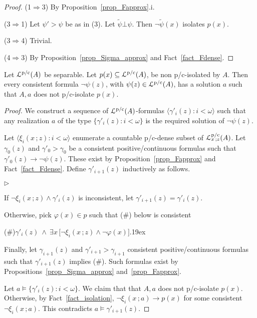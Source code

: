 \documentclass[10pt,oneside]{amsproc}
\newcommand{\mylabel}[1]{{#1}\hfill}
\renewenvironment{itemize}
  {\begin{list}{$\triangleright$}{%
  \setlength{\parskip}{0mm}
  \setlength{\topsep}{.4\baselineskip}
  \setlength{\rightmargin}{0mm}
  \setlength{\listparindent}{0mm}
  \setlength{\itemindent}{0mm}
  \setlength{\labelwidth}{3ex}
  \setlength{\itemsep}{.2\baselineskip}
  \setlength{\parsep}{.2\baselineskip}
  \setlength{\partopsep}{0mm}
  \setlength{\labelsep}{1ex}
  \setlength{\leftmargin}{\labelwidth+\labelsep}
  \let\makelabel\mylabel}}{%
\end{list}}
\begin{document}
{\begin{proof}
  (1$\Rightarrow$3) By Proposition~\ref{prop_Fapprox}.i.

  (3$\Rightarrow$1) Let $\psi'>\psi$ be as in (3). Let $\tilde{\psi}\bot\psi$. Then $\neg\tilde{\psi}(x)$ isolates $p(x)$.
  
  (3$\Rightarrow$4) Trivial.
  
  (4$\Rightarrow$3) By Proposition~\ref{prop_Sigma_approx} and Fact~\ref{fact_Fdense}. 
\end{proof}


\begin{lemma}\label{lem_kuratowskiUlam}
  Let ${\EuScript L}^{\rm p/c}(A)$ be separable.
  Let $p(x)\subseteq{\EuScript L}^{\rm p/c}(A)$, be non p/c-isolated by $A$.
  Then every consistent formula $\neg\psi(z)$, with $\psi(z)\in{\EuScript L}^{\rm p/c}(A)$, has a solution $a$ such that $A,a$ does not p/c-isolate $p(x)$.
\end{lemma}

\begin{proof}
  We construct a sequence of ${\EuScript L}^{\rm p/c}(A)$-formulas $\langle\gamma'_i(z):i<\omega\rangle$ such that any realization $a$ of the type $\big\{\gamma'_i(z):i<\omega\big\}$ is the required solution of $\neg\psi(z)$.
  
  Let $\langle\xi_i(x\,;z):i<\omega\rangle$ enumerate a countable p/c-dense subset of ${\EuScript L}^{\rm p/c}_{x\,;z}(A)$.
  Let $\gamma_0(z)$ and $\gamma'_0>\gamma_0$ be a consistent positive/continuous formulas such that $\gamma'_0(z)\rightarrow\neg\psi(z)$.
  These exist by Proposition~\ref{prop_Fapprox} and Fact~\ref{fact_Fdense}.
  Define $\gamma'_{i+1}(z)$ inductively as follows.
  
  \begin{itemize}
  \item[1.] If $\neg\xi_i(x\,;z)\wedge\gamma'_i(z)$ is inconsistent, let  $\gamma'_{i+1}(z)=\gamma'_i(z)$.
  \item[2.] Otherwise, pick $\varphi(x)\in p$ such that (\#) below is consistent
  
  (\#)\hfil$\gamma'_i(z)\ \wedge\ \exists x\,\big[\neg\xi_i(x\,;z)\wedge\neg\varphi(x)\big].$\kern19ex
  
  Finally, let $\gamma_{i+1}(z)$ and $\gamma'_{i+1}>\gamma_{i+1}$ consistent positive/continuous formulas such that $\gamma'_{i+1}(z)$ implies (\#).
  Such formulas exist by Propositions~\ref{prop_Sigma_approx} and~\ref{prop_Fapprox}.
  \end{itemize}
  
  Let $a\models\{\gamma'_i(z):i<\omega\}$.
  We claim that that $A,a$ does not p/c-isolate $p(x)$.
  Otherwise, by Fact~\ref{fact_isolation}, $\neg\xi_i(x\,;a)\rightarrow p(x)$ for some consistent $\neg\xi_i(x\,;a)$.
  This contradicts $a\models\gamma'_{i+1}(z)$.
  

\end{proof}}
\end{document}
